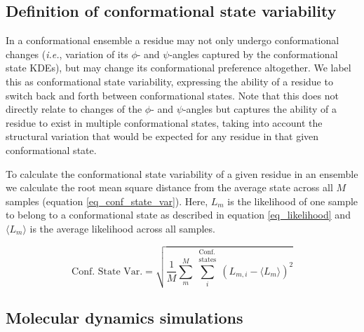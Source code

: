 \subsection{Definition of conformational state variability} \label{conva_definition}

In a conformational ensemble a residue may not only undergo conformational changes (\textit{i.e.}, variation of its $\phi$- and $\psi$-angles captured by the conformational state KDEs), but may change its conformational preference altogether. We label this as conformational state variability, expressing the ability of a residue to switch back and forth between conformational states. Note that this does not directly relate to changes of the $\phi$- and $\psi$-angles but captures the ability of a residue to exist in multiple conformational states, taking into account the structural variation that would be expected for any residue in that given conformational state.

To calculate the conformational state variability of a given residue in an ensemble we calculate the root mean square distance from the average state across all $M$ samples (equation \ref{eq_conf_state_var}). Here, $L_m$ is the likelihood of one sample to belong to a conformational state as described in equation \ref{eq_likelihood} and $\langle L_m \rangle$ is the average likelihood across all samples.

\begin{equation}
\label{eq_conf_state_var}
\text{Conf. State Var.} = \sqrt{
  \frac{1}{M}
  \sum\limits^{M}_m
  \sum\limits^{\substack{\text{Conf.} \\ \text{states}}}_i
  (L_{m,i} - \langle L_{m} \rangle)^{2}
}
\end{equation}


\subsection{Molecular dynamics simulations} \label{MD_data_origin}

